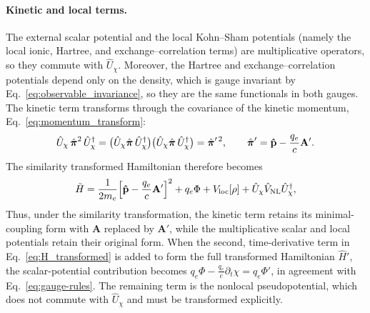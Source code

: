 
\paragraph{Kinetic and local terms.}
The external scalar
potential and the local Kohn--Sham potentials (namely the local ionic, Hartree,
and exchange--correlation terms)  are multiplicative operators, so they commute
with $\hat U_\chi$. Moreover, the Hartree and exchange--correlation potentials
depend only on the density, which is gauge invariant by
Eq.~\eqref{eq:observable_invariance}, so they are the same functionals in both
gauges. 
The kinetic term transforms through the covariance
of the kinetic momentum, Eq.~\eqref{eq:momentum_transform}:
\begin{equation}
  \hat U_\chi\,\hat{\boldsymbol{\pi}}^2\,\hat U_\chi^\dagger
  = \big(\hat U_\chi\hat{\boldsymbol{\pi}}\,\hat U_\chi^\dagger\big)
    \big(\hat U_\chi\hat{\boldsymbol{\pi}}\,\hat U_\chi^\dagger\big)
  = \hat{\boldsymbol{\pi}}'^{\,2},
  \qquad
  \hat{\boldsymbol{\pi}}' = \vb{\hat p} - \frac{q_e}{c}\vb A' .
  \nonumber
\end{equation}
The similarity transformed Hamiltonian therefore becomes
\begin{equation}
  \tilde  H = \frac{1}{2m_e}\Big[\vb{\hat p} - \frac{q_e}{c}\vb A'\Big]^2
          + q_e\Phi + V_{\mathrm{loc}}[\rho]
          + \hat U_\chi\hat V_{\mathrm{NL}}\hat U_\chi^\dagger, 
  \label{eq:H_similarity_transformed}
\end{equation}
Thus, under the similarity transformation, the kinetic term retains its minimal-coupling 
form with $\mathbf A$ replaced by $\mathbf A'$, while the multiplicative scalar and local
potentials retain their original form. 
When the second, time-derivative term in Eq.~\eqref{eq:H_transformed} is added 
to form the full transformed Hamiltonian $\hat H'$, the scalar-potential contribution becomes
$ q_e\Phi-\frac{q_e}{c}\partial_t\chi=q_e\Phi'$, in agreement with Eq.~\eqref{eq:gauge-rules}.
The remaining  term is the nonlocal pseudopotential, 
which does not commute with $\hat U_\chi$ and must be transformed explicitly.

